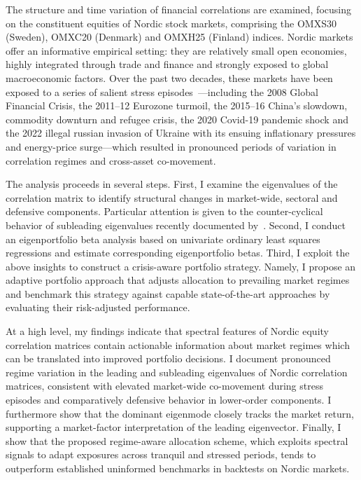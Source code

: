 \documentclass[pdflatex,sn-basic]{sn-jnl}%
\theoremstyle{thmstyleone}%
\theoremstyle{thmstyletwo}%
\theoremstyle{thmstylethree}%
\begin{document}
The structure and time variation of financial correlations are examined, focusing on the constituent 
equities of Nordic stock markets, comprising the OMXS30 (Sweden), OMXC20 (Denmark) and OMXH25 (Finland) indices. 
Nordic markets offer an informative empirical setting: they are relatively small open economies,
highly integrated through trade and finance and strongly exposed to global
macroeconomic factors. Over the past two decades, these markets have been exposed to a series of salient 
stress episodes~\citep{diamond2024politics}---including the 2008 Global Financial Crisis, the 2011--12 Eurozone turmoil, 
the 2015--16 China's slowdown, commodity downturn and refugee crisis, the 2020 Covid-19 pandemic shock and the 2022 illegal russian 
invasion of Ukraine with its ensuing inflationary pressures and energy-price surge---which resulted in pronounced 
periods of variation in correlation regimes and cross-asset co-movement.

The analysis proceeds in several steps. First, I examine the eigenvalues 
of the correlation matrix to identify structural changes in
market-wide, sectoral and defensive components. Particular attention is given
to the counter-cyclical behavior of subleading eigenvalues recently documented
by~\citet{molero2025random}. Second, I conduct an eigenportfolio beta analysis based on univariate ordinary 
least squares regressions and estimate corresponding eigenportfolio 
betas. Third, I exploit the above insights to construct a
crisis-aware portfolio strategy. Namely, I propose an adaptive portfolio
approach that adjusts allocation to prevailing market regimes and benchmark 
this strategy against capable state-of-the-art approaches by evaluating their risk-adjusted performance. 

At a high level, my findings indicate that spectral features of Nordic equity correlation 
matrices contain actionable information about market regimes which can be translated into 
improved portfolio decisions. I document pronounced regime variation in the leading and 
subleading eigenvalues of Nordic correlation matrices, consistent with elevated market-wide 
co-movement during stress episodes and comparatively defensive behavior in lower-order components. 
I furthermore show that the dominant eigenmode closely tracks the market return, 
supporting a market-factor interpretation of the leading eigenvector. 
Finally, I show that the proposed regime-aware allocation scheme, which exploits 
spectral signals to adapt exposures across tranquil and stressed periods, tends to 
outperform established uninformed benchmarks in backtests on Nordic markets.
\end{document}
